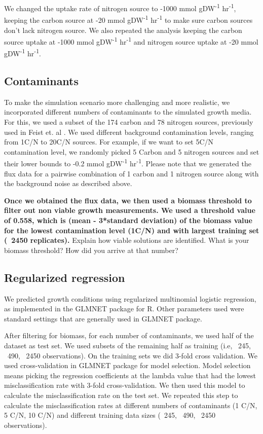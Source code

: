 \documentclass[12pt]{article}
\begin{document}
We changed the uptake rate of nitrogen source to -1000 mmol gDW\textsuperscript{-1} hr\textsuperscript{-1}, keeping the carbon source at -20 mmol gDW\textsuperscript{-1} hr\textsuperscript{-1} to make sure carbon sources don't lack nitrogen source. We also repeated the analysis keeping the carbon source uptake at -1000 mmol gDW\textsuperscript{-1} hr\textsuperscript{-1} and nitrogen source uptake at -20 mmol gDW\textsuperscript{-1} hr\textsuperscript{-1}. 

\subsection*{Contaminants}
To make the simulation scenario more challenging and more realistic, we incorporated different numbers of contaminants to the simulated growth media. For this, we used a subset of the 174 carbon and 78 nitrogen sources, previously used in Feist et. al \cite{Feistetal2007}.  We used different background contamination levels, ranging from 1C/N to 20C/N sources. For example, if we want to set 5C/N contamination level, we randomly picked 5 Carbon and 5 nitrogen sources and set their lower bounds to -0.2 mmol gDW\textsuperscript{-1} hr\textsuperscript{-1}. Please note that we generated the flux data for a pairwise combination of 1 carbon and 1 nitrogen source along with the background noise as described above. 

\textbf{Once we obtained the flux data, we then used a biomass threshold to filter out non viable growth measurements. We used a threshold value of 0.558, which is (mean - 3*standard deviation) of the biomass value for the lowest contamination level (1C/N) and with largest training set (~2450 replicates).}
{\color{red}Explain how viable solutions are identified. What is your biomass threshold? How did you arrive at that number?}


\subsection*{Regularized regression}

We predicted growth conditions using regularized multinomial logistic regression, as implemented in the GLMNET package \cite{Friedmanetal2010} for R. Other parameters used were standard settings that are generally used in GLMNET package.

After filtering for biomass, for each number of contaminants, we used half of the dataset as test set. We used subsets of the remaining half as training (i.e, ~245, ~490, ~2450 observations). On the training sets we did 3-fold cross validation. We used cross-validation in GLMNET package for model selection. Model selection means picking the regression coefficients at the lambda value that had the lowest misclassification rate with 3-fold cross-validation. We then used this model to calculate the misclassification rate on the test set. We repeated this step to calculate the misclassification rates at different numbers of contaminants (1 C/N, 5 C/N, 10 C/N) and different training data sizes (~245, ~490, ~2450 observations).
\end{document}
